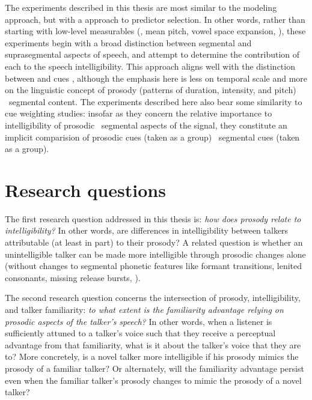 The experiments described in this thesis are most similar to the modeling approach, but with a  approach to predictor selection.  In other words, rather than starting with low-level measurables (\eg, mean pitch, vowel space expansion, \etc), these experiments begin with a broad distinction between segmental and suprasegmental aspects of speech, and attempt to determine the contribution of each to the speech intelligibility.  This approach aligns well with the distinction between  and  cues \citep{Rosen1992}, although the emphasis here is less on temporal scale and more on the linguistic concept of prosody (patterns of duration, intensity, and pitch) \vs\ segmental content.\footnotemark{}  The experiments described here also bear some similarity to cue weighting studies: insofar as they concern the relative importance to intelligibility of prosodic \vs\ segmental aspects of the signal, they constitute an implicit comparision of prosodic cues (taken as a group) \vs\ segmental cues (taken as a group).


\section{Research questions}
The first research question addressed in this thesis is: {\em how does prosody relate to intelligibility?}  In other words, are differences in intelligibility between talkers attributable (at least in part) to their prosody?  A related question is whether an unintelligible talker can be made more intelligible through prosodic changes alone (without changes to segmental phonetic features like formant transitions, lenited consonants, missing release bursts, \etc).


The second research question concerns the intersection of prosody, intelligibility, and talker familiarity: {\em to what extent is the familiarity advantage relying on prosodic aspects of the talker’s speech?}  In other words, when a  listener is sufficiently attuned to a talker’s voice such that they receive a perceptual advantage from that familiarity, what is it about the talker’s voice that they are  to?  More concretely, is a novel talker more intelligible if his prosody mimics the prosody of a familiar talker?  Or alternately, will the familiarity advantage persist even when the familiar talker’s prosody changes to mimic the prosody of a novel talker?

